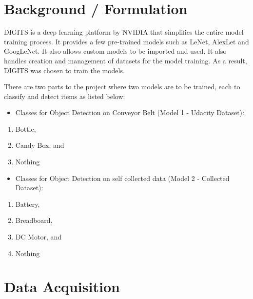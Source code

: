 \documentclass[10pt,journal,compsoc]{IEEEtran}
\begin{document}
\section{Background / Formulation}

DIGITS \cite{yeager2015digits} is a deep learning platform by NVIDIA that simplifies the entire model training process. It provides a few pre-trained models such as LeNet, AlexLet and GoogLeNet. It also allows custom models to be imported and used. It also handles creation and management of datasets for the model training. As a result, DIGITS was chosen to train the models. 

There are two parts to the project where two models are to be trained, each to classify and detect items as listed below:

\begin{itemize}
\item Classes for Object Detection on Conveyor Belt (Model 1 - Udacity Dataset):
\end {itemize}

\begin{enumerate}
\setlength{\itemindent}{+.2in}
\item Bottle, 
\item Candy Box, and
\item Nothing
\end{enumerate}

\begin{itemize}
\item Classes for Object Detection on self collected data (Model 2 - Collected Dataset):
\end {itemize}

\begin{enumerate}
\setlength{\itemindent}{+.2in}
\item Battery, 
\item Breadboard,
\item DC Motor, and
\item Nothing
\end{enumerate}

\section{Data Acquisition}
\end{document}
